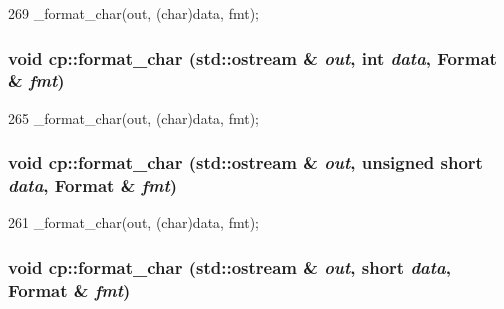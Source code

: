 \begin{DoxyCode}
269 { _format_char(out, (char)data, fmt); }
\end{DoxyCode}
\hypertarget{namespacecp_ad0a44d88420011ebcb330f4df4ac2a7a}{
\subsubsection[{format\_\-char}]{\setlength{\rightskip}{0pt plus 5cm}void cp::format\_\-char (std::ostream \& {\em out}, \/  int {\em data}, \/  Format \& {\em fmt})}}
\label{namespacecp_ad0a44d88420011ebcb330f4df4ac2a7a}



\begin{DoxyCode}
265 { _format_char(out, (char)data, fmt); }
\end{DoxyCode}
\hypertarget{namespacecp_a692ac8f80fe2d8f482bd1c6cc4518219}{
\subsubsection[{format\_\-char}]{\setlength{\rightskip}{0pt plus 5cm}void cp::format\_\-char (std::ostream \& {\em out}, \/  unsigned short {\em data}, \/  Format \& {\em fmt})}}
\label{namespacecp_a692ac8f80fe2d8f482bd1c6cc4518219}



\begin{DoxyCode}
261 { _format_char(out, (char)data, fmt); }
\end{DoxyCode}
\hypertarget{namespacecp_a9f48feafb852220f8e2baa551abca2af}{
\subsubsection[{format\_\-char}]{\setlength{\rightskip}{0pt plus 5cm}void cp::format\_\-char (std::ostream \& {\em out}, \/  short {\em data}, \/  Format \& {\em fmt})}}
\label{namespacecp_a9f48feafb852220f8e2baa551abca2af}



